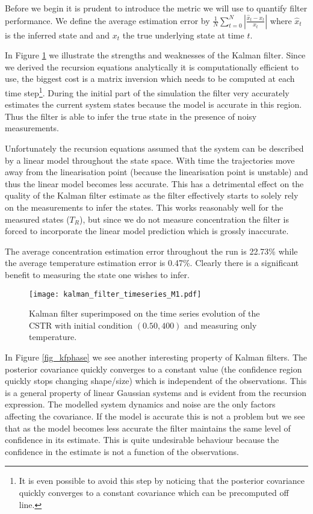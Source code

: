 Before we begin it is prudent to introduce the metric we will use to quantify filter performance. We define the average estimation error by $\frac{1}{N}\sum^N_{t=0}|\frac{\hat{x}_t-x_t}{x_t}|$ where $\hat{x}_t$ is the inferred state and and $x_t$ the true underlying state at time $t$.

In Figure \ref{fig_kftimeseries} we illustrate the strengths and weaknesses of the Kalman filter. Since we derived the recursion equations analytically it is computationally efficient to use, the biggest cost is a matrix inversion which needs to be computed at each time step\footnote{It is even possible to avoid this step by noticing that the posterior covariance quickly converges to a constant covariance which can be precomputed off line.}. During the initial part of the simulation the filter very accurately estimates the current system states because the model is accurate in this region. Thus the filter is able to infer the true state in the presence of noisy measurements. 

Unfortunately the recursion equations assumed that the system can be described by a linear model throughout the state space. With time the trajectories move away from the linearisation point (because the linearisation point is unstable) and thus the linear model becomes less accurate. This has a detrimental effect on the quality of the Kalman filter estimate as the filter effectively starts to solely rely on the measurements to infer the states. This works reasonably well for the measured states ($T_R$), but since we do not measure concentration the filter is forced to incorporate the linear model prediction which is grossly inaccurate. 

The average concentration estimation error throughout the run is 22.73\% while the average temperature estimation error is 0.47\%. Clearly there is a significant benefit to measuring the state one wishes to infer. 
\begin{figure}[H] 
\centering
\texttt{[image: kalman\_filter\_timeseries\_M1.pdf]}
\caption{Kalman filter superimposed on the time series evolution of the CSTR with initial condition $(0.50, 400)$ and measuring only temperature.}
\label{fig_kftimeseries}
\end{figure}
In Figure \ref{fig_kfphase} we see another interesting property of Kalman filters. The posterior covariance quickly converges to a constant value (the confidence region quickly stops changing shape/size) which is independent of the observations. This is a general property of linear Gaussian systems \cite{barber} and is evident from the recursion expression. The modelled system dynamics and noise are the only factors affecting the covariance. If the model is accurate this is not a problem but we see that as the model becomes less accurate the filter maintains the same level of confidence in its estimate. This is quite undesirable behaviour because the confidence in the estimate is not a function of the observations. 


